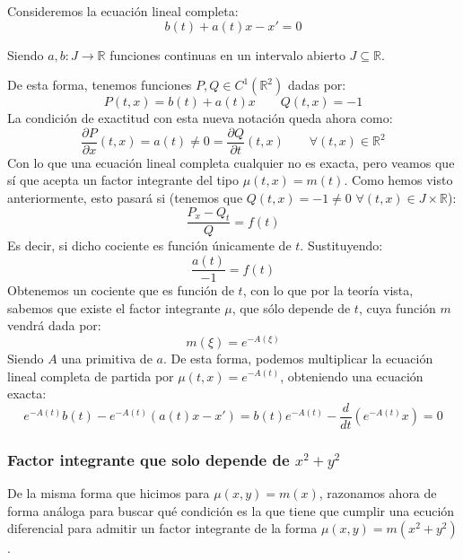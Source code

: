\begin{ejemplo}
    Consideremos la ecuación lineal completa:
    \begin{equation*}
        b(t) + a(t)x - x' = 0
    \end{equation*}

    Siendo $a,b:J\rightarrow\mathbb{R}$ funciones continuas en un intervalo abierto $J\subseteq \mathbb{R}$.

    De esta forma, tenemos funciones $P,Q\in C^1(\mathbb{R}^2)$ dadas por:
    \begin{equation*}
        P(t,x) = b(t) + a(t)x \qquad Q(t,x) = -1
    \end{equation*}
    La condición de exactitud con esta nueva notación queda ahora como:
    \begin{equation*}
        \dfrac{\partial P}{\partial x}(t,x) = a(t) \neq 0 = \dfrac{\partial Q}{\partial t}(t,x) \qquad \forall (t,x)\in \mathbb{R}^2
    \end{equation*}
    Con lo que una ecuación lineal completa cualquier no es exacta, pero veamos que sí que acepta un factor integrante del tipo $\mu(t,x)=m(t)$. Como hemos visto anteriormente, esto pasará si (tenemos que $Q(t,x)=-1\neq 0$ $\forall (t,x)\in J\times \mathbb{R}$):
    \begin{equation*}
        \dfrac{P_x-Q_t}{Q} = f(t)
    \end{equation*}
    Es decir, si dicho cociente es función únicamente de $t$. Sustituyendo:
    \begin{equation*}
        \dfrac{a(t)}{-1} = f(t)
    \end{equation*}
    Obtenemos un cociente que es función de $t$, con lo que por la teoría vista, sabemos que existe el factor integrante $\mu$, que sólo depende de $t$, cuya función $m$ vendrá dada por:
    \begin{equation*}
        m(\xi) = e^{-A(\xi)}
    \end{equation*}
    Siendo $A$ una primitiva de $a$. De esta forma, podemos multiplicar la ecuación lineal completa de partida por $\mu(t,x) = e^{-A(t)}$, obteniendo una ecuación exacta:
    \begin{equation*}
        e^{-A(t)}b(t) - e^{-A(t)}(a(t)x - x') = b(t)e^{-A(t)} - \dfrac{d}{dt}\left(e^{-A(t)}x\right) = 0
    \end{equation*}
\end{ejemplo}

\subsubsection{Factor integrante que solo depende de $x^2+y^2$}
De la misma forma que hicimos para $\mu(x,y)=m(x)$, razonamos ahora de forma análoga para buscar qué condición es la que tiene que cumplir una ecución diferencial para admitir un factor integrante de la forma $\mu(x,y)=m(x^2+y^2)$.

